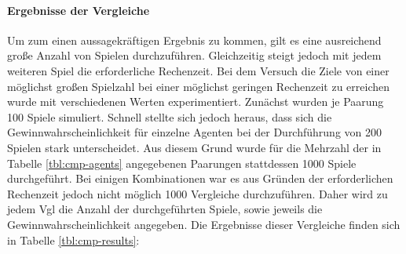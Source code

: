 \paragraph{Ergebnisse der Vergleiche}
\label{p:vgl-result}
Um zum einen aussagekräftigen Ergebnis zu kommen, gilt es eine ausreichend große Anzahl von Spielen durchzuführen. Gleichzeitig steigt jedoch mit jedem weiteren Spiel die erforderliche Rechenzeit. Bei dem Versuch die Ziele von einer möglichst großen Spielzahl bei einer möglichst geringen Rechenzeit zu erreichen wurde mit verschiedenen Werten experimentiert. Zunächst wurden je Paarung 100 Spiele simuliert. Schnell stellte sich jedoch heraus, dass sich die Gewinnwahrscheinlichkeit für einzelne Agenten bei der Durchführung von 200 Spielen stark unterscheidet. Aus diesem Grund wurde für die Mehrzahl der in Tabelle \ref{tbl:cmp-agents} angegebenen Paarungen stattdessen 1000 Spiele durchgeführt. Bei einigen Kombinationen war es aus Gründen der erforderlichen Rechenzeit jedoch nicht möglich 1000 Vergleiche durchzuführen. Daher wird zu jedem \ac{Vgl} die Anzahl der durchgeführten Spiele, sowie jeweils die Gewinnwahrscheinlichkeit angegeben. Die Ergebnisse dieser Vergleiche finden sich in Tabelle \ref{tbl:cmp-results}:

